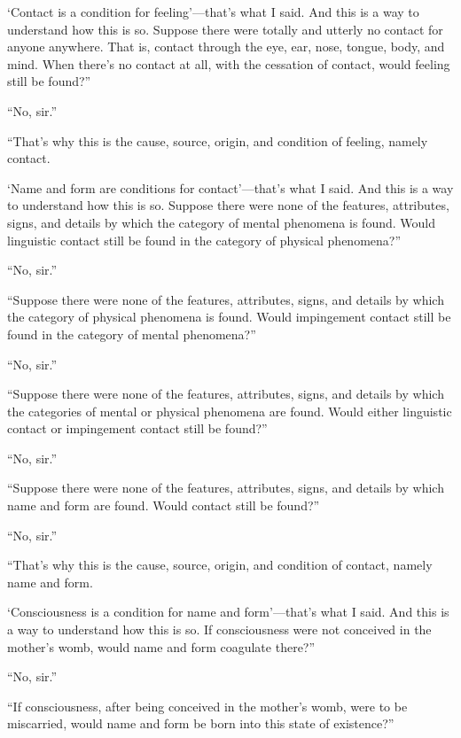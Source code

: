 \documentclass[12pt,openany]{book}%
\begin{document}
‘Contact is a condition for feeling’—that’s what I said. And this is a way to understand how this is so. Suppose there were totally and utterly no contact for anyone anywhere. That is, contact through the eye, ear, nose, tongue, body, and mind. When there’s no contact at all, with the cessation of contact, would feeling still be found?” 

“No, sir.” 

“That’s why this is the cause, source, origin, and condition of feeling, namely contact. 

‘Name and form are conditions for contact’—that’s what I said. And this is a way to understand how this is so. Suppose there were none of the features, attributes, signs, and details by which the category of mental phenomena is found. Would linguistic contact still be found in the category of physical phenomena?” 

“No, sir.” 

“Suppose there were none of the features, attributes, signs, and details by which the category of physical phenomena is found. Would impingement contact still be found in the category of mental phenomena?” 

“No, sir.” 

“Suppose there were none of the features, attributes, signs, and details by which the categories of mental or physical phenomena are found. Would either linguistic contact or impingement contact still be found?” 

“No, sir.” 

“Suppose there were none of the features, attributes, signs, and details by which name and form are found. Would contact still be found?” 

“No, sir.” 

“That’s why this is the cause, source, origin, and condition of contact, namely name and form. 

‘Consciousness is a condition for name and form’—that’s what I said. And this is a way to understand how this is so. If consciousness were not conceived in the mother’s womb, would name and form coagulate there?” 

“No, sir.” 

“If consciousness, after being conceived in the mother’s womb, were to be miscarried, would name and form be born into this state of existence?” 
\end{document}
